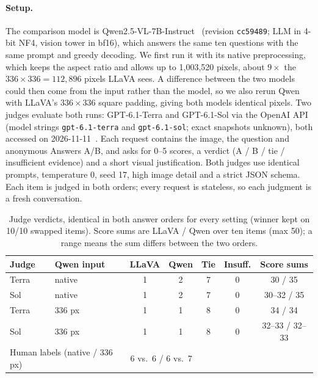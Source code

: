 \documentclass[10pt,twocolumn,letterpaper]{article}
\begin{document}
\paragraph{Setup.} The comparison model is Qwen2.5-VL-7B-Instruct~\cite{bai2025qwen25vl,qwen25vl7b_hf} (revision \texttt{cc59489}; LLM in 4-bit NF4, vision tower in bf16), which answers the same ten questions with the same prompt and greedy decoding. We first run it with its native preprocessing, which keeps the aspect ratio and allows up to 1,003,520 pixels, about $9\times$ the $336\times336=112{,}896$ pixels LLaVA sees. A difference between the two models could then come from the input rather than the model, so we also rerun Qwen with LLaVA's $336\times336$ square padding, giving both models identical pixels. Two judges evaluate both runs: GPT-6.1-Terra and GPT-6.1-Sol via the OpenAI API (model strings \texttt{gpt-6.1-terra} and \texttt{gpt-6.1-sol}; exact snapshots unknown), both accessed on 2026-11-11~\cite{zheng2023judging}. Each request contains the image, the question and anonymous Answers A/B, and asks for 0--5 scores, a verdict (A / B / tie / insufficient evidence) and a short visual justification. Both judges use identical prompts, temperature 0, seed 17, high image detail and a strict JSON schema. Each item is judged in both orders; every request is stateless, so each judgment is a fresh conversation.

\begin{table}[t]
  \centering
  \footnotesize
  \setlength{\tabcolsep}{3pt}
  \begin{tabular}{llccccc}
    \toprule
    Judge & Qwen input & LLaVA & Qwen & Tie & Insuff. & Score sums \\
    \midrule
    Terra & native & 1 & 2 & 7 & 0 & 30 / 35 \\
    Sol   & native & 1 & 2 & 7 & 0 & 30--32 / 35 \\
    Terra & 336 px & 1 & 1 & 8 & 0 & 34 / 34 \\
    Sol   & 336 px & 1 & 1 & 8 & 0 & 32--33 / 32--33 \\
    \midrule
    \multicolumn{2}{l}{Human labels (native / 336 px)} & \multicolumn{2}{c}{6 vs.\ 6 / 6 vs.\ 7} & & & \\
    \bottomrule
  \end{tabular}
  \caption{Judge verdicts, identical in both answer orders for every setting (winner kept on 10/10 swapped items). Score sums are LLaVA / Qwen over ten items (max 50); a range means the sum differs between the two orders.}
  \label{tab:judge}
\end{table}
\end{document}
